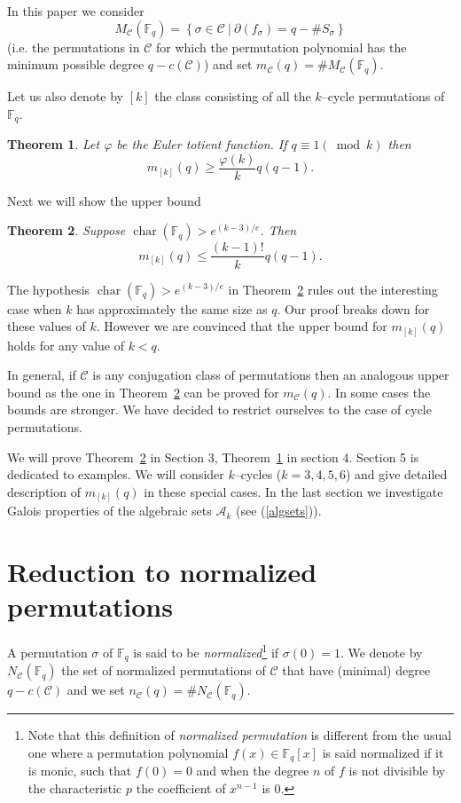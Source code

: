\documentclass[a4paper,twoside]{article}
\newtheorem{Theorem}{Theorem}[section]
\begin{document}
In this paper  we consider
$$M_{\mathcal C}(\mathbb F_q)=\left\{\sigma\in\mathcal C\ |\ \partial(f_\sigma)=q-\#S_\sigma\right\}$$
(i.e. the permutations in
$\mathcal C$ for which the permutation polynomial has the minimum possible degree  $q-c(\mathcal C)$) and set $m_{\mathcal C}(q)=\# M_{\mathcal C}(\mathbb F_q)$.

Let us also denote by $[k]$ the class consisting of all the
$k$--cycle permutations of $\mathbb F_q$.

\begin{Theorem} \label{ciclotomico} Let $\varphi$ be the Euler totient function.
If  $q\equiv1(\bmod k)$ then
$$m_{[k]}(q)\geq \frac{\varphi(k)}{k} q(q-1).$$
\end{Theorem}

Next we will show the upper bound

\begin{Theorem}\label{geometrico} Suppose
$\operatorname{char}(\mathbb F_q)>e^{(k-3)/e}$. Then
$$m_{[k]}(q)\leq \frac{(k-1)!}{k}q(q-1).$$
\end{Theorem}

The hypothesis $\operatorname{char}(\mathbb F_q)>e^{(k-3)/e}$ in Theorem~\ref{geometrico} rules
out the interesting case when $k$ has approximately the same size
as $q$. Our proof breaks down for these values of $k$. However we are convinced
that the upper bound for $m_{[k]}(q)$ holds for any value of $k<q$.

In general, if $\mathcal C$ is any
conjugation class of permutations then an analogous
upper bound as the one in Theorem~\ref{geometrico} can be proved
for $m_{\mathcal C}(q)$.
In some cases the bounds are stronger.
We have decided to restrict ourselves to the case of cycle permutations.

We will prove Theorem~\ref{geometrico} in Section 3, Theorem~\ref{ciclotomico} in section 4.
Section 5 is dedicated to examples. We will consider
$k$--cycles ($k=3,4,5,6$) and give detailed description of $m_{[k]}(q)$
in these special cases. In the last
section we investigate Galois properties of the algebraic sets $\mathcal A_k$ (see (\ref{algsets})).

\section{Reduction to normalized permutations}

A permutation $\sigma$ of $\mathbb F_q$ is said to be
\emph{normalized}\footnote{Note that this definition of
\emph{normalized permutation} is different from the usual one
where a permutation polynomial $f(x)\in\mathbb F_q[x]$ is said
normalized if it is monic, such that $f(0) = 0$ and when the
degree $n$ of $f$ is not divisible by the characteristic $p$ the
coefficient of $x^{n-1}$ is $0$.} if $\sigma(0)=1$. We denote by
$N_{\mathcal C}(\mathbb F_q)$ the set of normalized permutations
of $\mathcal C$ that have (minimal) degree $q-c(\mathcal C)$ and
we set $n_{\mathcal C}(q)=\#N_{\mathcal C}(\mathbb F_q)$.
\end{document}
